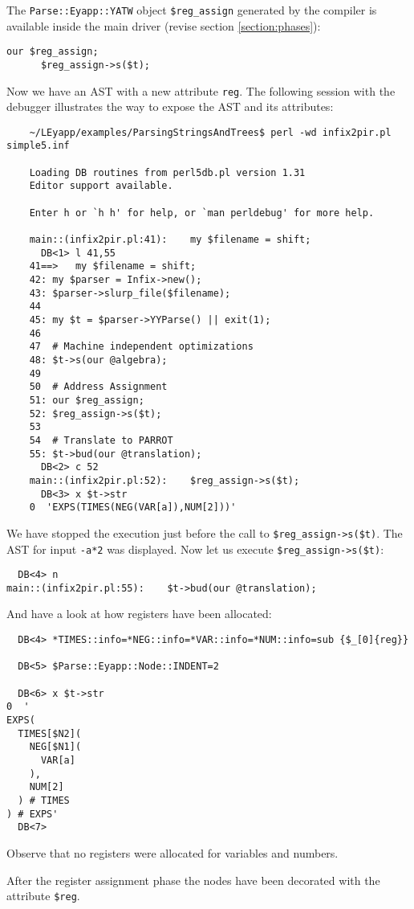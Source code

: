 The \verb|Parse::Eyapp::YATW| object \verb|$reg_assign|
generated by the compiler is available inside
the main driver (revise section \ref{section:phases}):
\begin{verbatim}
our $reg_assign;
      $reg_assign->s($t);
\end{verbatim}
Now we have an AST  with a new attribute \verb|reg|.
The following session with the debugger illustrates 
the way to expose the AST and its attributes:
\begin{verbatim}
    ~/LEyapp/examples/ParsingStringsAndTrees$ perl -wd infix2pir.pl simple5.inf

    Loading DB routines from perl5db.pl version 1.31
    Editor support available.

    Enter h or `h h' for help, or `man perldebug' for more help.

    main::(infix2pir.pl:41):    my $filename = shift;
      DB<1> l 41,55
    41==>   my $filename = shift;
    42: my $parser = Infix->new(); 
    43: $parser->slurp_file($filename);
    44  
    45: my $t = $parser->YYParse() || exit(1);
    46  
    47  # Machine independent optimizations
    48: $t->s(our @algebra);  
    49  
    50  # Address Assignment 
    51: our $reg_assign;
    52: $reg_assign->s($t);
    53  
    54  # Translate to PARROT
    55: $t->bud(our @translation);
      DB<2> c 52
    main::(infix2pir.pl:52):    $reg_assign->s($t);
      DB<3> x $t->str
    0  'EXPS(TIMES(NEG(VAR[a]),NUM[2]))'
\end{verbatim}
We have stopped the execution just before the 
call to \verb|$reg_assign->s($t)|. The AST
for input \verb|-a*2| was displayed. Now let us execute
\verb|$reg_assign->s($t)|:
\begin{verbatim}
  DB<4> n
main::(infix2pir.pl:55):    $t->bud(our @translation);
\end{verbatim}
And have a look at how registers have been allocated:

\begin{verbatim}
  DB<4> *TIMES::info=*NEG::info=*VAR::info=*NUM::info=sub {$_[0]{reg}}

  DB<5> $Parse::Eyapp::Node::INDENT=2

  DB<6> x $t->str
0  '
EXPS(
  TIMES[$N2](
    NEG[$N1](
      VAR[a]
    ),
    NUM[2]
  ) # TIMES
) # EXPS'
  DB<7> 
\end{verbatim}
Observe that no registers
were allocated for variables and numbers.

After the register assignment phase
the nodes have been decorated with
the attribute \verb|$reg|. 

